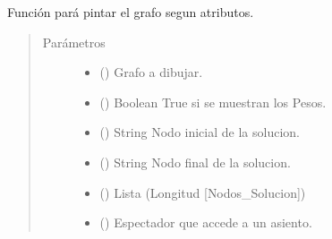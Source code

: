 \documentclass[letterpaper,10pt,spanish]{sphinxmanual}
\begin{document}
\begin{fulllineitems}
\label{\detokenize{Funciones:Funciones.DibujarGrafoAtributos}}
\sphinxAtStartPar
Función pará pintar el grafo segun atributos.
\begin{quote}\begin{description}
\item[{Parámetros}] \leavevmode\begin{itemize}
\item {} 
\sphinxAtStartPar
{} () \textendash{} Grafo a dibujar.

\item {} 
\sphinxAtStartPar
{} () \textendash{} Boolean \sphinxhyphen{} True si se muestran los Pesos.

\item {} 
\sphinxAtStartPar
{} () \textendash{} String \sphinxhyphen{} Nodo inicial de la solucion.

\item {} 
\sphinxAtStartPar
{} () \textendash{} String \sphinxhyphen{} Nodo final de la solucion.

\item {} 
\sphinxAtStartPar
{} () \textendash{} Lista \sphinxhyphen{} (Longitud {[}Nodos\_Solucion{]})

\item {} 
\sphinxAtStartPar
{} ({\hyperref[\detokenize{Clases:Clases.Espectador}]{}}) \textendash{} Espectador que accede a un asiento.


\end{itemize}
\end{description}
\end{quote}
\end{fulllineitems}
\end{document}
